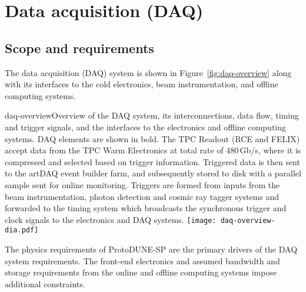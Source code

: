 \section{Data acquisition (DAQ)} 
\label{sec:daq}

\subsection{Scope and requirements}

The data acquisition (DAQ) system is shown in Figure~\ref{fig:daq-overview} along with its
interfaces to the cold electronics, beam instrumentation, and offline
computing systems.  

\begin{cdrfigure}{daq-overview}{Overview of the
DAQ system, its interconnections, data flow, timing and trigger signals,
and the interfaces to the electronics and offline computing systems.  DAQ elements are shown in bold. The TPC Readout (RCE and FELIX) accept
data from the TPC Warm Electronics at total rate of 480\,Gb/s, where it is compressed and 
selected based on trigger information.  Triggered data is then sent to the artDAQ event builder farm, and subsequently 
stored to disk with a parallel sample sent for online monitoring.  Triggers are formed from inputs 
from the beam instrumentation, photon detection and cosmic ray tagger systems and forwarded
to the timing system which broadcasts the synchronous trigger and clock signals to the electronics and DAQ systems.
}
        \texttt{[image: daq-overview-dia.pdf]}
\end{cdrfigure}

 
The physics requirements of  ProtoDUNE-SP are the primary drivers of the
DAQ system requirements.
The front-end electronics and assumed bandwidth and storage requirements
from the online and offline computing systems impose additional constraints.  

